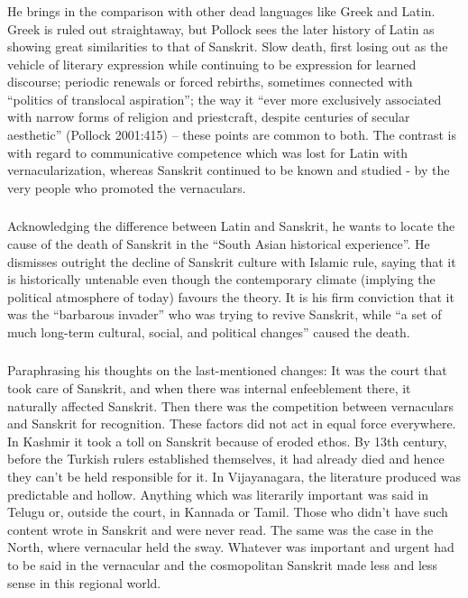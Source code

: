 \subsubsection{} He brings in the comparison with other dead languages like Greek and Latin. Greek is ruled out straightaway, but Pollock sees the later history of Latin as showing great similarities to that of Sanskrit. Slow death, first losing out as the vehicle of literary expression while continuing to be expression for learned discourse; periodic renewals or forced rebirths, sometimes connected with “politics of translocal aspiration”; the way it “ever more exclusively associated with narrow forms of religion and priestcraft, despite centuries of secular aesthetic” (Pollock 2001:415) – these points are common to both. The contrast is with regard to communicative competence which was lost for Latin with vernacularization, whereas Sanskrit continued to be known and studied - by the very people who promoted the vernaculars.

\subsubsection{} Acknowledging the difference between Latin and Sanskrit, he wants to locate the cause of the death of Sanskrit in the “South Asian historical experience”. He dismisses outright the decline of Sanskrit culture with Islamic rule, saying that it is historically untenable even though the contemporary climate (implying the political atmosphere of today) favours the theory. It is his firm conviction that it was the “barbarous invader” who was trying to revive Sanskrit, while “a set of much long-term cultural, social, and political changes” caused the death.

\subsubsection{} Paraphrasing his thoughts on the last-mentioned changes: It was the court that took care of Sanskrit, and when there was internal enfeeblement there, it naturally affected Sanskrit. Then there was the competition between vernaculars and Sanskrit for recognition. These factors did not act in equal force everywhere. In Kashmir it took a toll on Sanskrit because of eroded ethos. By 13th century, before the Turkish rulers established themselves, it had already died and hence they can’t be held responsible for it. In Vijayanagara, the literature produced was predictable and hollow. Anything which was literarily important was said in Telugu or, outside the court, in Kannada or Tamil. Those who didn’t have such content wrote in Sanskrit and were never read. The same was the case in the North, where vernacular held the sway. Whatever was important and urgent had to be said in the vernacular and the cosmopolitan Sanskrit made less and less sense in this regional world.

